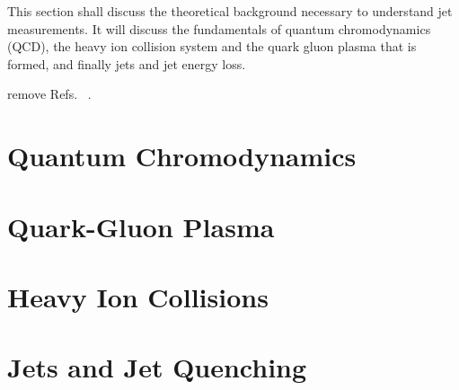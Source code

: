 This section shall discuss the theoretical background necessary to understand jet measurements. It will discuss the fundamentals of quantum chromodynamics (QCD), the heavy ion collision system and the quark gluon plasma that is formed, and finally jets and jet energy loss. 

remove Refs.~\cite{Roland:2014jsa} .
\section{Quantum Chromodynamics}
\label{sec:qcd}


\section{Quark-Gluon Plasma}
\label{sec:qgp}


\section{Heavy Ion Collisions}
\label{sec:HICollisions}


\section{Jets and Jet Quenching}
\label{sec:jets}

